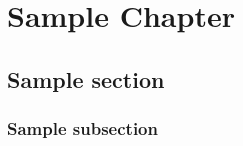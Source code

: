 \documentclass[../main/Progress.tex]{subfiles}
\begin{document}
	\chapter[Sample Chapter]{Sample Chapter}
	\section{Sample section}
	\subsection{Sample subsection}
\end{document}
